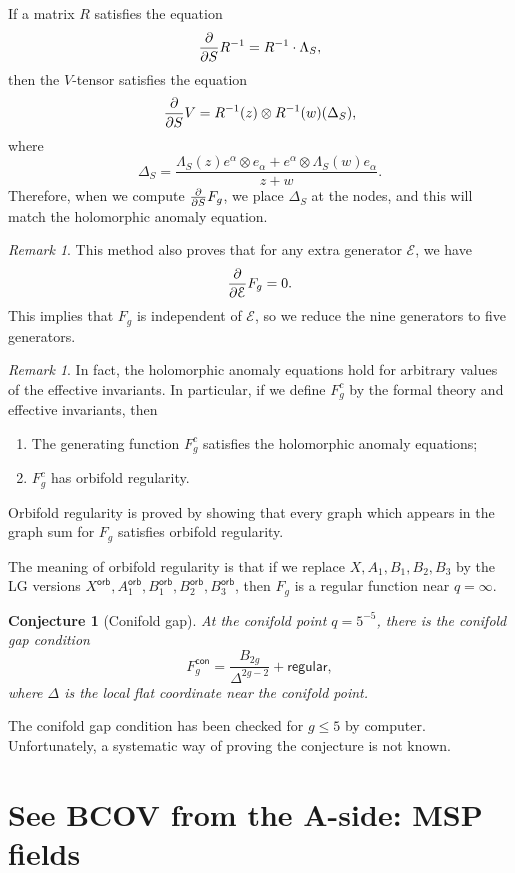 \documentclass[10pt]{amsart}
\newtheorem{conj}[thm]{Conjecture}
\theoremstyle{definition}
\theoremstyle{remark}
\newtheorem{rmk}[thm]{Remark}
\theoremstyle{plain}
\theoremstyle{definition}
\theoremstyle{remark}
\newcommand{\mc}[1]{\mathcal{#1}}
\newcommand{\ms}[1]{\mathsf{#1}}
\newcommand{\1}{\mathbf{1}}
\newcommand{\2}{\mathbf{2}}
\newcommand{\3}{\mathbf{3}}
\begin{document}
If a matrix $R$ satisfies the equation
\[ \pdv{}{S} R^{-1} = R^{-1} \cdot \Lambda_S, \]
then the $V$-tensor satisfies the equation
\[ \pdv{}{S} V = R^{-1}(z) \otimes R^{-1}(w) (\Delta_S), \]
where
\[ \Delta_S = \frac{\Lambda_S(z) e^{\alpha} \otimes e_{\alpha} + e^{\alpha} \otimes \Lambda_S(w) e_{\alpha}}{z+w}. \]
Therefore, when we compute $\pdv{}{S} F_g$, we place $\Delta_S$ at the nodes, and this will match the holomorphic anomaly equation.

\begin{rmk}
    This method also proves that for any extra generator $\mc{E}$, we have
    \[ \pdv{}{\mc{E}} F_g = 0. \]
    This implies that $F_g$ is independent of $\mc{E}$, so we reduce the nine generators to five generators.
\end{rmk}

\begin{rmk}
    In fact, the holomorphic anomaly equations hold for arbitrary values of the effective invariants. In particular, if we define $F_g^c$ by the formal theory and effective invariants, then
    \begin{enumerate}
        \item The generating function $F_g^c$ satisfies the holomorphic anomaly equations;
        \item $F_g^c$ has orbifold regularity.
    \end{enumerate}
    Orbifold regularity is proved by showing that every graph which appears in the graph sum for $F_g$ satisfies orbifold regularity.
\end{rmk}

The meaning of orbifold regularity is that if we replace $X,A_1, B_1, B_2, B_3$ by the LG versions $X^{\ms{orb}}, A_1^{\ms{orb}}, B_1^{\ms{orb}}, B_2^{\ms{orb}}, B_3^{\ms{orb}}$, then $F_g$ is a regular function near $q = \infty$.

\begin{conj}[Conifold gap]
    At the conifold point $q = 5^{-5}$, there is the \textit{conifold gap condition}
    \[ F_g^{\ms{con}} = \frac{B_{2g}}{\Delta^{2g-2}} + \ms{regular}, \]
    where $\Delta$ is the local flat coordinate near the conifold point.
\end{conj}

The conifold gap condition has been checked for $g \leq 5$ by computer. Unfortunately, a systematic way of proving the conjecture is not known.



\part{See BCOV from the A-side: MSP fields}
\label{pt:msp}
\end{document}
